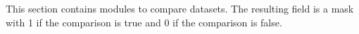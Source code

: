 This section contains modules to compare datasets.
The resulting field is a mask with 1 if the comparison is true
and 0 if the comparison is false.

